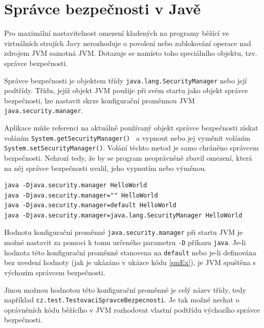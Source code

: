 \section{Správce bezpečnosti v Javě} \label{securityManager}

Pro maximální nastavitelnost omezení kladených na programy běžící ve virtuálních strojích Javy nerozhoduje o povolení nebo zablokování operace nad zdrojem JVM samotná JVM. Dotazuje se namísto toho speciálního objektu, tzv. správce bezpečnosti. \cite{tutorialsTSM}

Správce bezpečnosti je objektem třídy {\tt java.lang.SecurityManager} nebo její podtřídy.
Třídu, jejíž objekt JVM použije při svém startu jako objekt správce bezpečnosti, lze nastavit skrze konfigurační proměnnou JVM {\tt java.security.manager}. \cite{javaSecurityArch}

Aplikace může referenci na aktuálně používaný objekt správce bezpečnosti získat voláním {\tt System.getSecurityManager() } a vypnout nebo jej vyměnit voláním {\tt System.setSecurityManager()}. Volání těchto metod je samo chráněno správcem bezpečnosti. Nehrozí tedy, že by se program neoprávněně zbavil omezení, která na něj správce bezpečnosti uvalil, jeho vypnutím nebo výměnou. \cite{tutorialsTSM}

\begin{lstlisting}[caption=Příkazy spouštějící program s výchozím správcem bezpečnosti, label=smEx]
java -Djava.security.manager HelloWorld
java -Djava.security.manager="" HelloWorld
java -Djava.security.manager=default HelloWorld
java -Djava.security.manager=java.lang.SecurityManager HelloWorld
\end{lstlisting}

Hodnotu konfigurační proměnné {\tt java.security.manager} při startu JVM je možné nastavit za pomoci k tomu určeného parametru {\tt -D} příkazu {\tt java}.
Je-li hodnota této konfigurační proměnné stanovena na {\tt default} nebo je-li definována bez uvedení hodnoty (jak je ukázáno v ukázce kódu \ref{smEx}),
je JVM spuštěna s výchozím správcem bezpečnosti. \cite{javaSecurityArch}

Jinou možnou hodnotou této konfigurační proměnné je celý název třídy, tedy například {\tt cz.test.TestovaciSpravceBezpecnosti}.
Je tak možné nechat o oprávněních kódu běžícího v JVM rozhodovat vlastní podtřídu výchozího správce bezpečnosti.

